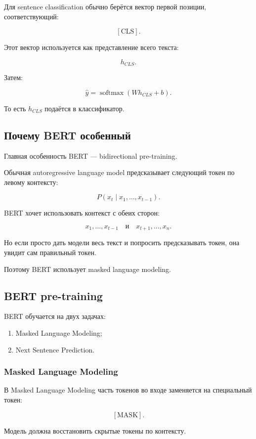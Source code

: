 \documentclass[a4paper,12pt]{article}
\begin{document}
Для sentence classification обычно берётся вектор первой позиции, соответствующий:

\[
[\text{CLS}].
\]

Этот вектор используется как представление всего текста:

\[
h_{CLS}.
\]

Затем:

\[
\hat{y}
=
\operatorname{softmax}(Wh_{CLS}+b).
\]

То есть \(h_{CLS}\) подаётся в классификатор.

\subsection{Почему BERT особенный}

Главная особенность BERT --- bidirectional pre-training.

Обычная autoregressive language model предсказывает следующий токен по левому контексту:

\[
P(x_t \mid x_1,\dots,x_{t-1}).
\]

BERT хочет использовать контекст с обеих сторон:

\[
x_1,\dots,x_{t-1}
\quad \text{и} \quad
x_{t+1},\dots,x_n.
\]

Но если просто дать модели весь текст и попросить предсказывать токен, она увидит сам правильный токен.

Поэтому BERT использует masked language modeling.

\subsection{BERT pre-training}

BERT обучается на двух задачах:

\begin{enumerate}
    \item Masked Language Modeling;
    \item Next Sentence Prediction.
\end{enumerate}

\subsubsection{Masked Language Modeling}

В Masked Language Modeling часть токенов во входе заменяется на специальный токен:

\[
[\text{MASK}].
\]

Модель должна восстановить скрытые токены по контексту.
\end{document}
